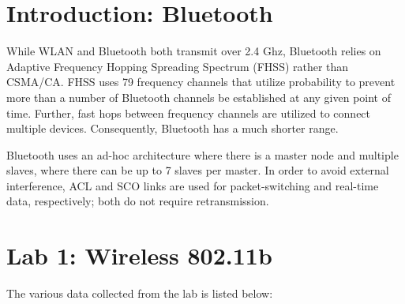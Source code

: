 \documentclass[twoside,twocolumn]{article}
\begin{document}

\section{Introduction: Bluetooth}

While WLAN and Bluetooth both transmit over 2.4 Ghz, Bluetooth relies on Adaptive Frequency Hopping Spreading Spectrum (FHSS) rather than CSMA/CA. FHSS uses 79 frequency channels that utilize probability to prevent more than a number of Bluetooth channels be established at any given point of time. Further, fast hops between frequency channels are utilized to connect multiple devices. Consequently, Bluetooth has a much shorter range.

\hfill

\noindent Bluetooth uses an ad-hoc architecture where there is a master node and multiple slaves, where there can be up to 7 slaves per master. In order to avoid external interference, ACL and SCO links are used for packet-switching and real-time data, respectively; both do not require retransmission.


\section{Lab 1: Wireless 802.11b}

The various data collected from the lab is listed below:

\hfill

\begin{table}[!htbp]
\caption{Signal Strength vs Distance}
\centering
{}
\end{table}

\begin{table}[!htbp]
\caption{Signal to Noise Ratio vs Distance}
\centering
{}
\end{table}
\end{document}
